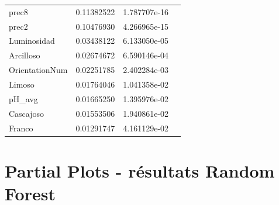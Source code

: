 \begin{table}[H]
\begin{tabular}{llll}
		prec8          & 0.11382522 & 1.787707e-16  \\
		prec2          & 0.10476930 & 4.266965e-15  \\
		Luminosidad    & 0.03438122 & 6.133050e-05  \\
		Arcilloso      & 0.02674672 & 6.590146e-04  \\
		OrientationNum & 0.02251785 & 2.402284e-03  \\
		Limoso         & 0.01764046 & 1.041358e-02  \\
		pH\_avg        & 0.01665250 & 1.395976e-02  \\
		Cascajoso      & 0.01553506 & 1.940861e-02  \\
		Franco         & 0.01291747 & 4.161129e-02 
	\end{tabular}
\end{table}















\chapter{Partial Plots - résultats Random Forest}





















